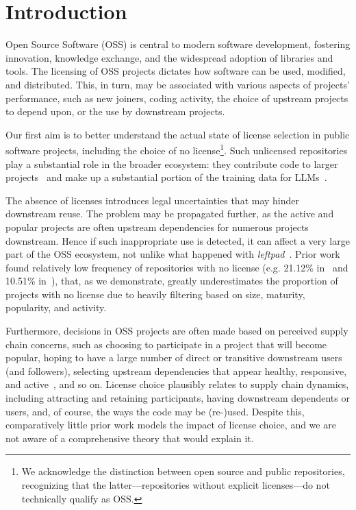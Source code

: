 \section{Introduction}\label{intro}

Open Source Software (OSS) is central to modern
software development, fostering innovation, knowledge exchange, and
the widespread adoption of libraries and tools.  The
licensing of OSS projects dictates how software can be used,
modified, and distributed. This, in turn, may be associated with various aspects of projects' performance, such as new joiners, coding activity, the choice of upstream projects to depend upon, or the use by downstream projects.  

Our first aim is to better understand the actual state of license
selection in public software projects, including the choice of no license\footnote{
We acknowledge the distinction between open source and public repositories, 
recognizing that the latter---repositories without explicit licenses---do not 
technically qualify as OSS.}.
Such unlicensed repositories play a substantial role in the broader
ecosystem: they contribute code to larger
projects~\cite{jahanshahi2025beyond} and make up a substantial portion of
the training data for LLMs~\cite{yu2023codeipprompt,xu2024first,jahanshahi2025cracks}.

The absence of licenses introduces legal uncertainties that may hinder
downstream reuse. 
The problem may be propagated further, as the active and popular
projects are often upstream dependencies for numerous projects
downstream.
Hence if such inappropriate use is detected, it can affect
a very large part of the OSS ecosystem, not unlike what happened with
\textit{leftpad}~\cite{chowdhury2021untriviality}.
Prior work found relatively low frequency of repositories with no
license (e.g. 21.12\% in~\cite{wu2024large} and 10.51\% 
in~\cite{cui2023empirical}), that, as we demonstrate,
greatly underestimates the proportion of projects with no license
due to heavily filtering based on size, maturity, popularity, and
activity.

Furthermore, decisions in OSS projects are often made based on perceived supply chain
concerns, such as choosing to participate in a project that will
become popular, hoping to have a large number of direct or
transitive downstream users (and followers), selecting upstream dependencies
that appear healthy, responsive, and
active~\cite{socialCoding,choice23,ma2020methodology}, and so on.
License choice plausibly relates to supply chain dynamics, including
attracting and retaining participants, having downstream dependents
or users, and, of course, the ways the code may be (re-)used.
Despite this, comparatively little prior work models the impact of
license choice, and we are not aware of a comprehensive theory that would
explain it.

